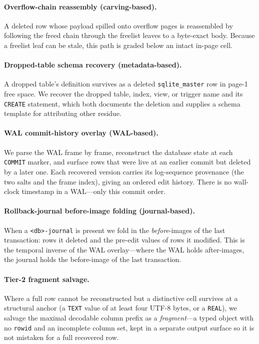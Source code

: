 \documentclass[10pt,a4paper]{article}
\newcommand{\code}[1]{\texttt{#1}}
\begin{document}
\paragraph{Overflow-chain reassembly (carving-based).}
A deleted row whose payload spilled onto overflow pages is reassembled by following
the freed chain through the freelist leaves to a byte-exact body. Because a freelist
leaf can be stale, this path is graded below an intact in-page cell.

\paragraph{Dropped-table schema recovery (metadata-based).}
A dropped table's definition survives as a deleted \code{sqlite\_master} row in
page-1 free space. We recover the dropped table, index, view, or trigger name and
its \code{CREATE} statement, which both documents the deletion and supplies a
schema template for attributing other residue.

\paragraph{WAL commit-history overlay (WAL-based).}
We parse the WAL frame by frame, reconstruct the database state at each
\code{COMMIT} marker, and surface rows that were live at an earlier commit but
deleted by a later one. Each recovered version carries its log-sequence provenance
(the two salts and the frame index), giving an ordered edit history. There is no
wall-clock timestamp in a WAL---only this commit order.

\paragraph{Rollback-journal before-image folding (journal-based).}
When a \code{<db>-journal} is present we fold in the \emph{before}-images of the
last transaction: rows it deleted and the pre-edit values of rows it modified. This
is the temporal inverse of the WAL overlay---where the WAL holds after-images, the
journal holds the before-image of the last transaction.

\paragraph{Tier-2 fragment salvage.}
Where a full row cannot be reconstructed but a distinctive cell survives at a
structural anchor (a \code{TEXT} value of at least four UTF-8 bytes, or a
\code{REAL}), we salvage the maximal decodable column prefix as a \emph{fragment}---a
typed object with no \code{rowid} and an incomplete column set, kept in a separate
output surface so it is not mistaken for a full recovered row.
\end{document}
